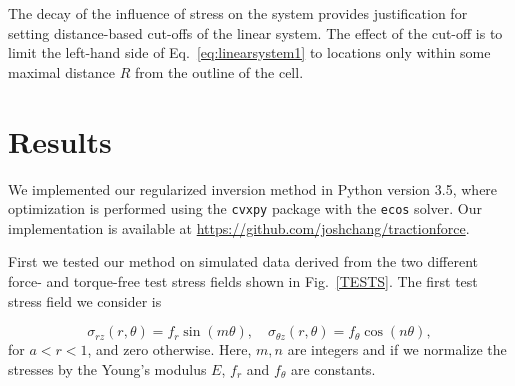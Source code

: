 \documentclass[aps,prl,reprint,twocolumn,groupedaddress,showpacs]{revtex4-1}
\newcommand{\bsigma}{{\boldsymbol\sigma}}
\def\r{{\bf r}}
\begin{document}
The decay of the influence of stress on the system provides
justification for setting distance-based cut-offs of the linear
system. The effect of the cut-off is to limit the left-hand side of
Eq.~\ref{eq:linearsystem1} to locations only within some maximal
distance $R$ from the outline of the cell.


\section{Results}

We implemented our regularized inversion method in Python version 3.5,
where optimization is performed using the \texttt{cvxpy} package with
the \texttt{ecos} solver.  Our implementation is available at
\url{https://github.com/joshchang/tractionforce}. 

First we tested our method on simulated data derived from the two
different force- and torque-free test stress fields shown in
Fig.~\ref{TESTS}. The first test stress field we consider is

\begin{equation}
\sigma_{rz}(r,\theta) = f_{r} \sin (m\theta),\quad 
\sigma_{\theta z}(r,\theta) = f_{\theta} \cos (n\theta),
\end{equation}
%
for $a < r < 1$, and zero otherwise. Here, $m,n$ are integers and
if we normalize the stresses by the Young's modulus $E$, $f_{r}$ and
$f_{\theta}$ are constants.
\end{document}
